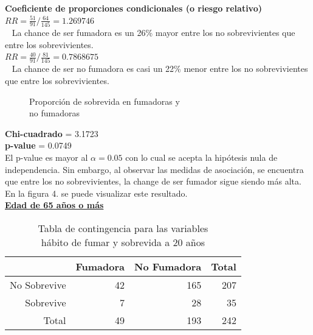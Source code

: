 \documentclass[12pt,letterpaper,fleqn]{article}
\begin{document}
\begin{enumerate}[label=\textbf{\arabic*.}]
\begin{enumerate}[label=\textbf{\alph*.}]
                \textbf{Coeficiente de proporciones condicionales (o riesgo relativo)}\\
                 $ RR =  \frac{51}{91}/\frac{64}{145} = 1.269746 $ \\ 
                 La chance de ser fumadora es un 26\% mayor entre los no sobrevivientes que entre los sobrevivientes.\\
                 $ RR =  \frac{40}{91}/\frac{81}{145} = 0.7868675 $ \\ 
                 La chance de ser no fumadora es casi un 22\% menor entre los no sobrevivientes que entre los sobrevivientes.\\

                \begin{figure}[!htb]
                    \centering
                    
                    \caption{Proporción de sobrevida en fumadoras y \\no fumadoras}
                    \label{fig:figure4}
                \end{figure}
                \FloatBarrier
                \textbf{Chi-cuadrado} = 3.1723 \\
                \textbf{p-value} = 0.0749 \\
                El p-value es mayor al $ \alpha = 0.05 $ con lo cual se acepta la hipótesis nula de independencia. Sin embargo, al observar las medidas de asociación, se encuentra que entre los no sobrevivientes, la change de ser fumador sigue siendo más alta. En la figura 4. se puede visualizar este resultado.\\

                \underline{\textbf{Edad de 65 años o más}}
                \begin{table}[ht]
                    \centering
                    \caption{Tabla de contingencia para las variables \\ hábito de fumar y sobrevida a 20 años}
                    \begin{tabular}{rrrr}
                      \hline
                     & Fumadora & No Fumadora \vline& Total \\
                      \hline
                    No Sobrevive & 42 & 165 \vline& 207 \\
                      Sobrevive & 7 & 28 \vline & 35 \\
                      \hline
                      Total & 49 & 193 \vline & 242 \\
                       \hline
                    \end{tabular}
                \end{table}


\end{enumerate}
\end{enumerate}
\end{document}
